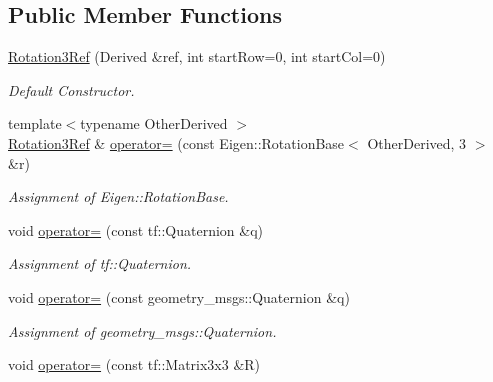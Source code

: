 \subsection*{Public Member Functions}
\begin{DoxyCompactItemize}
\item 
\hyperlink{classow__core_1_1Rotation3Ref_a8835f31c0085b6e29af2df3358121b3a}{Rotation3\+Ref} (Derived \&ref, int start\+Row=0, int start\+Col=0)
\begin{DoxyCompactList}\small\item\em Default Constructor. \end{DoxyCompactList}\item 
{\footnotesize template$<$typename Other\+Derived $>$ }\\\hyperlink{classow__core_1_1Rotation3Ref}{Rotation3\+Ref} \& \hyperlink{classow__core_1_1Rotation3Ref_a9b31c385b6c5225f747ea08945642cb8}{operator=} (const Eigen\+::\+Rotation\+Base$<$ Other\+Derived, 3 $>$ \&r)\hypertarget{classow__core_1_1Rotation3Ref_a9b31c385b6c5225f747ea08945642cb8}{}\label{classow__core_1_1Rotation3Ref_a9b31c385b6c5225f747ea08945642cb8}

\begin{DoxyCompactList}\small\item\em Assignment of Eigen\+::\+Rotation\+Base. \end{DoxyCompactList}\item 
void \hyperlink{classow__core_1_1Rotation3Ref_a0b58716ea88baa8d13515bbe5ffe76f2}{operator=} (const tf\+::\+Quaternion \&q)\hypertarget{classow__core_1_1Rotation3Ref_a0b58716ea88baa8d13515bbe5ffe76f2}{}\label{classow__core_1_1Rotation3Ref_a0b58716ea88baa8d13515bbe5ffe76f2}

\begin{DoxyCompactList}\small\item\em Assignment of tf\+::\+Quaternion. \end{DoxyCompactList}\item 
void \hyperlink{classow__core_1_1Rotation3Ref_a4823dd9bcb419d9f92b1fce8f88d495a}{operator=} (const geometry\+\_\+msgs\+::\+Quaternion \&q)\hypertarget{classow__core_1_1Rotation3Ref_a4823dd9bcb419d9f92b1fce8f88d495a}{}\label{classow__core_1_1Rotation3Ref_a4823dd9bcb419d9f92b1fce8f88d495a}

\begin{DoxyCompactList}\small\item\em Assignment of geometry\+\_\+msgs\+::\+Quaternion. \end{DoxyCompactList}\item 
void \hyperlink{classow__core_1_1Rotation3Ref_a8f91b728de1db5da5775121c358e0521}{operator=} (const tf\+::\+Matrix3x3 \&R)\hypertarget{classow__core_1_1Rotation3Ref_a8f91b728de1db5da5775121c358e0521}{}\label{classow__core_1_1Rotation3Ref_a8f91b728de1db5da5775121c358e0521}


\end{DoxyCompactItemize}
